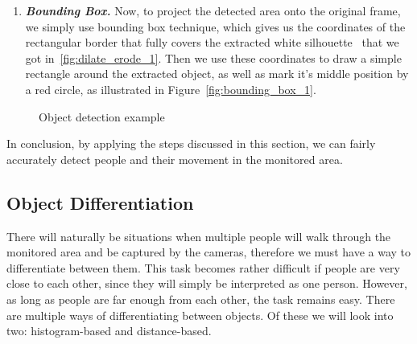 \begin{enumerate}
\item \textit{\textbf{Bounding Box.}} Now, to project the detected area onto the original frame, we simply use bounding box technique, which gives us the coordinates of the rectangular border that fully covers the extracted white silhouette~\cite{bounding_box_1} that we got in~\ref{fig:dilate_erode_1}. Then we use these coordinates to draw a simple rectangle around the extracted object, as well as mark it's middle position by a red circle, as illustrated in Figure~\ref{fig:bounding_box_1}.
\end{enumerate}
\begin{figure}[ht]
	\centering
	\quad
	\quad
	\quad
	\caption{Object detection example}
	\label{fig:object_detection_example}
\end{figure}

In conclusion, by applying the steps discussed in this section, we can fairly accurately detect people and their movement in the monitored area.

\subsection{Object Differentiation}
\label{object_differentiation}
There will naturally be situations when multiple people will walk through the monitored area and be captured by the cameras, therefore we must have a way to differentiate between them. This task becomes rather difficult if people are very close to each other, since they will simply be interpreted as one person. However, as long as people are far enough from each other, the task remains easy. There are multiple ways of differentiating between objects. Of these we will look into two: histogram-based and distance-based.

